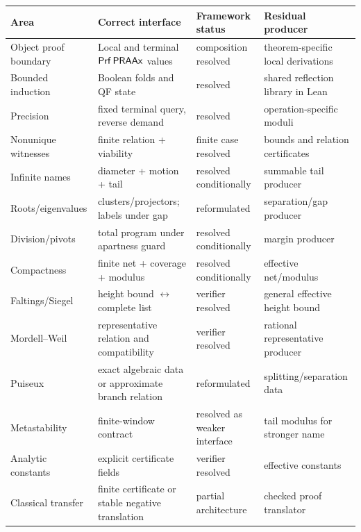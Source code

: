 \begin{longtable}{@{}p{}p{}p{}p{}@{}}
\toprule
Area & Correct interface & Framework status & Residual producer \\
\midrule
\endhead
Object proof boundary & Local and terminal \(\mathsf{Prf}\,\mathsf{PRAAx}\) values & composition resolved & theorem-specific local derivations \\
Bounded induction & Boolean folds and QF state & resolved & shared reflection library in Lean \\
Precision & fixed terminal query, reverse demand & resolved & operation-specific moduli \\
Nonunique witnesses & finite relation + viability & finite case resolved & bounds and relation certificates \\
Infinite names & diameter + motion + tail & resolved conditionally & summable tail producer \\
Roots/eigenvalues & clusters/projectors; labels under gap & reformulated & separation/gap producer \\
Division/pivots & total program under apartness guard & resolved conditionally & margin producer \\
Compactness & finite net + coverage + modulus & resolved conditionally & effective net/modulus \\
Faltings/Siegel & height bound \(\leftrightarrow\) complete list & verifier resolved & general effective height bound \\
Mordell--Weil & representative relation and compatibility & verifier resolved & rational representative producer \\
Puiseux & exact algebraic data or approximate branch relation & reformulated & splitting/separation data \\
Metastability & finite-window contract & resolved as weaker interface & tail modulus for stronger name \\
Analytic constants & explicit certificate fields & verifier resolved & effective constants \\
Classical transfer & finite certificate or stable negative translation & partial architecture & checked proof translator \\
\bottomrule
\end{longtable}
